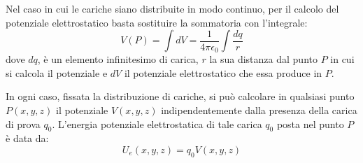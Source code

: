 \documentclass[class=book, crop=false, oneside, 12pt]{standalone}
\begin{document}
Nel caso in cui le cariche siano distribuite in modo continuo, per il calcolo del potenziale elettrostatico basta sostituire la sommatoria con l'integrale:
\begin{equation}
    V (P) = \int dV = \frac{1}{4 \pi \epsilon_0} \int \frac{d q}{r}
\end{equation}
dove \(dq\), è un elemento infinitesimo di carica, \(r\) la sua distanza dal punto \(P\) in cui si calcola il potenziale e \(dV\) il potenziale elettrostatico che essa produce in \(P\).

In ogni caso, fissata la distribuzione di cariche, si può calcolare in qualsiasi punto \(P(x, y, z)\) il potenziale \(V(x, y, z)\) indipendentemente dalla presenza della carica di prova \(q_0\).  
L'energia potenziale elettrostatica di tale carica \(q_0\) posta nel punto \(P\) è data da:
\begin{equation}
    U_e (x,y,z) = q_0 V(x,y,z)
\end{equation}
\end{document}
